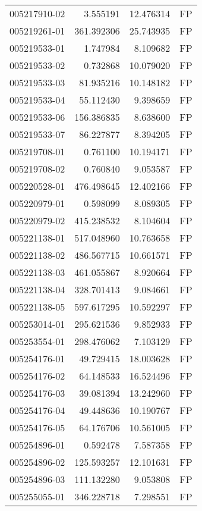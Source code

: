 \begin{tabular}{lrrl}
005217910-02 &    3.555191 &    12.476314 &   FP \\
005219261-01 &  361.392306 &    25.743935 &   FP \\
005219533-01 &    1.747984 &     8.109682 &   FP \\
005219533-02 &    0.732868 &    10.079020 &   FP \\
005219533-03 &   81.935216 &    10.148182 &   FP \\
005219533-04 &   55.112430 &     9.398659 &   FP \\
005219533-06 &  156.386835 &     8.638600 &   FP \\
005219533-07 &   86.227877 &     8.394205 &   FP \\
005219708-01 &    0.761100 &    10.194171 &   FP \\
005219708-02 &    0.760840 &     9.053587 &   FP \\
005220528-01 &  476.498645 &    12.402166 &   FP \\
005220979-01 &    0.598099 &     8.089305 &   FP \\
005220979-02 &  415.238532 &     8.104604 &   FP \\
005221138-01 &  517.048960 &    10.763658 &   FP \\
005221138-02 &  486.567715 &    10.661571 &   FP \\
005221138-03 &  461.055867 &     8.920664 &   FP \\
005221138-04 &  328.701413 &     9.084661 &   FP \\
005221138-05 &  597.617295 &    10.592297 &   FP \\
005253014-01 &  295.621536 &     9.852933 &   FP \\
005253554-01 &  298.476062 &     7.103129 &   FP \\
005254176-01 &   49.729415 &    18.003628 &   FP \\
005254176-02 &   64.148533 &    16.524496 &   FP \\
005254176-03 &   39.081394 &    13.242960 &   FP \\
005254176-04 &   49.448636 &    10.190767 &   FP \\
005254176-05 &   64.176706 &    10.561005 &   FP \\
005254896-01 &    0.592478 &     7.587358 &   FP \\
005254896-02 &  125.593257 &    12.101631 &   FP \\
005254896-03 &  111.132280 &     9.053808 &   FP \\
005255055-01 &  346.228718 &     7.298551 &   FP \\

\end{tabular}
